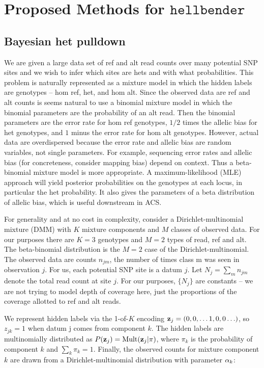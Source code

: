 \documentclass[nofootinbib,amssymb,amsmath]{revtex4}
\begin{document}
\section{Proposed Methods for $\texttt{hellbender}$} \label{proposed-methods-for-texttthellbender}

\subsection{Bayesian het pulldown} \label{bayesian-het-pulldown}

We are given a large data set of ref and alt read counts over many potential SNP sites and we wish to infer which sites are hets and with what probabilities.  This problem is naturally represented as a mixture model in which the hidden labels are genotypes -- hom ref, het, and hom alt.  Since the observed data are ref and alt counts is seems natural to use a binomial mixture model in which the binomial parameters are the probability of an alt read.  Then the binomial parameters are the error rate for hom ref genotypes, $1/2$ times the allelic bias for het genotypes, and $1$ minus the error rate for hom alt genotypes.  However, actual data are overdispersed because the error rate and allelic bias are random variables, not single parameters.  For example, sequencing error rates and allelic bias (for concreteness, consider mapping bias) depend on context.  Thus a beta-binomial mixture model is more appropriate.  A maximum-likelihood (MLE) approach will yield posterior probabilities on the genotypes at each locus, in particular the het probability.  It also gives the parameters of a beta distribution of allelic bias, which is useful downstream in ACS.

For generality and at no cost in complexity, consider a Dirichlet-multinomial mixture (DMM) with $K$ mixture components and $M$ classes of observed data.  For our purposes there are $K = 3$ genotypes and $M = 2$ types of read, ref and alt.  The beta-binomial distribution is the $M = 2$ case of the Dirichlet-multinomial.  The observed data are counts $n_{jm}$, the number of times class m was seen in observation $j$.  For us, each potential SNP site is a datum $j$.  Let $N_j = \sum_m n_{jm}$ denote the total read count at site $j$.  For our purposes, $\{ N_j \}$ are constants -- we are not trying to model depth of coverage here, just the proportions of the coverage allotted to ref and alt reads.

We represent hidden labels via the 1-of-$K$ encoding ${\bf z}_j = (0, 0, \ldots 1, 0, 0 \ldots)$, so $z_{jk} = 1$ when datum j comes from component $k$.  The hidden labels are multinomially distributed as $P({\bf z}_j) = {\rm Mult}({\bf z}_j | {\bf \pi})$, where $\pi_k$ is the probability of component $k$ and $\sum_k \pi_k = 1$.  Finally, the observed counts for mixture component $k$ are drawn from a Dirichlet-multinomial distribution with parameter ${\bf \alpha}_k$:
\end{document}
